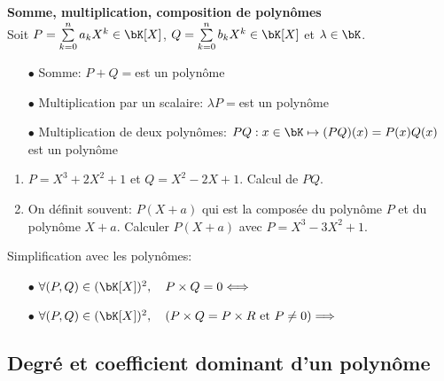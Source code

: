 \documentclass[a4paper, 11pt,reqno]{article}
\begin{document}
{\noindent

	\begin{theorem} \textbf{Somme, multiplication, composition de polyn\^omes}\\
		\noindent Soit $P=\sum\limits_{k=0}^n a_k X^k\in\bK[X]$, $Q=\sum\limits_{k=0}^n b_k X^k\in\bK[X]$ et $\lambda\in\bK$.\vsec
		\begin{itemize}
			\item[$\bullet$] Somme: $P+Q=$\dotfill est un polyn\^ome \vsec
			\item[$\bullet$] Multiplication par un scalaire: $\lambda P=$\dotfill est un polyn\^ome  \vsec
			\item[$\bullet$] Multiplication de deux polyn\^omes: $PQ: x\in\bK\mapsto (PQ)(x)=P(x)Q(x)$ est un polyn\^ome\vsec
		\end{itemize}
	\end{theorem}
}

{\footnotesize \begin{exercice}
		\begin{enumerate}
			\item $P=X^3+2X^2+1$ et $Q=X^2-2X+1$. Calcul de $PQ$.
			\item  On d\'efinit souvent: $P(X+a)$ qui est la compos\'ee du polyn\^ome $P$ et du polyn\^ome $X+a$. Calculer $P(X+a)$ avec $P=X^3-3X^2+1$.
		\end{enumerate}
	\end{exercice}
}\vsec\vsec

{\noindent

	\begin{prop} Simplification avec les polyn\^{o}mes:\vsec
		\begin{itemize}
			\item[$\bullet$] $\forall (P,Q)\in (\bK[X])^2,\quad P\times Q=0 \Longleftrightarrow$ \dotfill\vsec
			\item[$\bullet$] $\forall (P,Q)\in (\bK[X])^2,\quad \left(P\times Q=P\times R\ \hbox{et}\ P\not= 0\right) \Longrightarrow $ \dotfill \vsec
		\end{itemize}
	\end{prop}
}


\subsection{Degr\'e et coefficient dominant d'un polyn\^ome}
\end{document}
